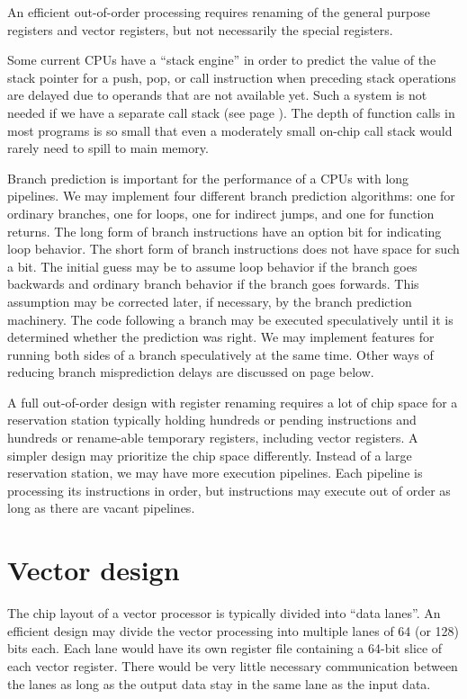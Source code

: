 \documentclass[forwardcom.tex]{subfiles}
\begin{document}
An efficient out-of-order processing requires renaming of the general purpose registers and vector registers, but not necessarily the special registers. 
\vv

Some current CPUs have a ``stack engine'' in order to predict the value of the stack pointer for a push, pop, or call instruction when preceding stack operations are delayed due to operands that are not available yet. Such a system is not needed if we have a separate call stack (see page \pageref{dualStack}). The depth of function calls in most programs is so small that even a moderately small on-chip call stack would rarely need to spill to main memory.
\vv

Branch prediction is important for the performance of a CPUs with long pipelines. We may implement four different branch prediction algorithms: one for ordinary branches, one for loops, one for indirect jumps, and one for function returns. The long form of branch instructions have an option bit for indicating loop behavior. The short form of branch instructions does not have space for such a bit. The initial guess may be to assume loop behavior if the branch goes backwards and ordinary branch behavior if the branch goes forwards. This assumption may be corrected later, if necessary, by the branch prediction machinery. The code following a branch may be executed speculatively until it is determined whether the prediction was right. We may implement features for running both sides of a branch speculatively at the same time. Other ways of reducing branch misprediction delays are discussed on page \pageref{branchProposal} below.
\vv

A full out-of-order design with register renaming requires a lot of chip space for a reservation station typically holding hundreds or pending instructions and hundreds or rename-able temporary registers, including vector registers. A simpler design may prioritize the chip space differently. Instead of a large reservation station, we may have more execution pipelines. Each pipeline is processing its instructions in order, but instructions may execute out of order as long as there are vacant pipelines. 
\vv


\section{Vector design}\label{vectorDesign}
The chip layout of a vector processor is typically divided into ``data lanes''. 
An efficient design may divide the vector processing into multiple lanes of 64 (or 128) bits each. Each lane would have its own register file containing a 64-bit slice of each vector register. There would be very little necessary communication between the lanes as long as the output data stay in the same lane as the input data. 
\vv
\end{document}
